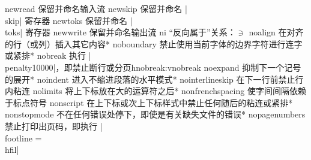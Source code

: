 \capcs newread {保留并命名输入流}{}{\@newread}
\capcs newskip {保留并命名 |\\skip| 寄存器}{}{\@newskip}
\capcs newtoks {保留并命名 |\\toks| 寄存器}{}{\@newtoks}
\capcs newwrite {保留并命名输出流}{}{\@newwrite}
\capcs ni {“反向属于”关系：$\ni$}{}{}
\capcs noalign {在对齐的行（或列）插入其它内容}*{}
\capcs noboundary {禁止使用当前字体的边界字符进行连字或紧排}*{}
\capcstwo nobreak {执行 |\\penalty10000|，即禁止断行或分页}{}{hnobreak:vnobreak}
\capcs noexpand {抑制下一个记号的展开}*{}
\capcs noindent {进入不缩进段落的水平模式}*{}
\capcs nointerlineskip {在下一行前禁止行内粘连}{}{}
\capcs nolimits {将上下标放在大的运算符之后}*{}
\capcs nonfrenchspacing {使字间间隔依赖于标点符号}{}{}
\capcs nonscript {在上下标或次上下标样式中禁止任何随后的粘连或紧排}*{}
\capcs nonstopmode {不在任何错误处停下，即使是有关缺失文件的错误}*{}
\capcs nopagenumbers {禁止打印出页码，即执行 |\\footline = {\\hfil}|}{}{}
